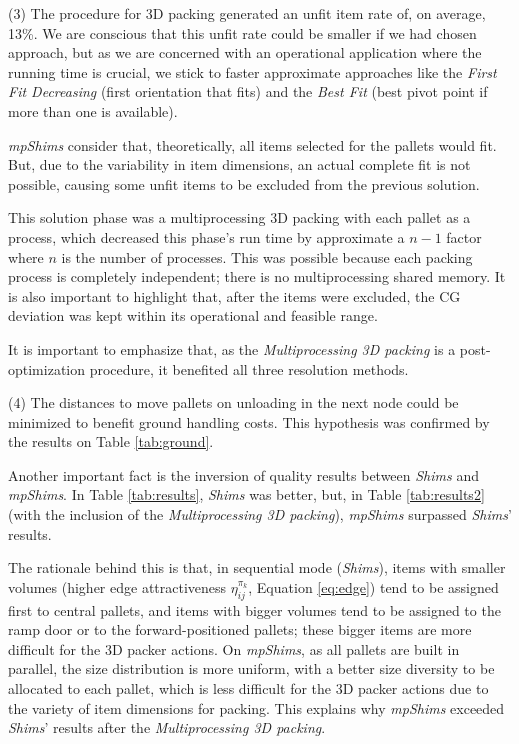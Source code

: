 \documentclass[preprint,authoryear]{elsarticle}
\begin{document}
(3) The procedure for 3D packing generated an unfit item rate of, on average, 13\%. We are conscious that this unfit rate could be smaller if we had chosen \cite{PaquayLimbourgSchynsOliveira2018} approach, but as we are concerned with an operational application where the running time is crucial, we stick to faster approximate approaches like the {\it First Fit Decreasing} (first orientation that fits) and the {\it Best Fit} (best pivot point if more than one is available).

{\it mpShims} consider that, theoretically, all items selected for the pallets would fit. But, due to the variability in item dimensions, an actual complete fit is not possible, causing some unfit items to be excluded from the previous solution.

This solution phase was a multiprocessing 3D packing with each pallet as a process, which decreased this phase's run time by approximate a $n-1$ factor where $n$ is the number of processes. This was possible because each packing process is completely independent; there is no multiprocessing shared memory. It is also important to highlight that, after the items were excluded, the CG deviation was kept within its operational and feasible range.

It is important to  emphasize that, as the {\it Multiprocessing 3D packing} is a post-optimization procedure, it benefited all three resolution methods.

(4) The distances to move pallets on unloading in the next node could be minimized to benefit ground handling costs.
This hypothesis was confirmed by the results on Table \ref{tab:ground}.

Another important fact is the inversion of quality results between {\it Shims} and {\it mpShims}. In Table \ref{tab:results}, {\it Shims} was better, but, in Table \ref{tab:results2} (with the inclusion of the {\it Multiprocessing 3D packing}), {\it mpShims} surpassed {\it Shims}' results.

The rationale behind this is that, in sequential mode ({\it Shims}), items with smaller volumes (higher edge attractiveness $\eta_{ij}^{\pi_k}$, Equation \ref{eq:edge}) tend to be assigned first to central pallets, and items with bigger volumes tend to be assigned to the ramp door or to the forward-positioned pallets; these bigger items are more difficult for the 3D packer actions. On {\it mpShims}, as all pallets are built in parallel, the size distribution is more uniform, with a better size diversity to be allocated to each pallet, which is less difficult for the 3D packer actions due to the variety of item dimensions for packing. This explains why {\it mpShims} exceeded {\it Shims}' results after the {\it Multiprocessing 3D packing}.
\end{document}
